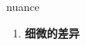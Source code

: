 
\begin{frame}
{\huge nuance}
\begin{center}
\begin{enumerate}\Large
  \item \textbf{细微的差异}
\end{enumerate}
\end{center}
\end{frame}
